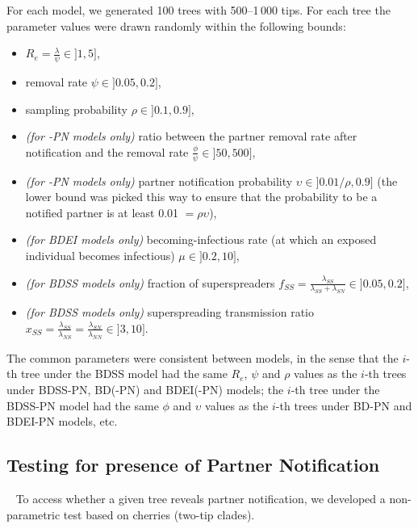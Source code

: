 \documentclass[10pt,letterpaper]{article}
\begin{document}
For each model, we generated 100 trees with 500--1\,000 tips. For each tree the parameter values were drawn randomly within the following bounds:
\begin{itemize}
\item $R_e = \frac{{\lambda}}{{\psi}} \in ]1, 5]$, 
\item removal rate $\psi \in ]0.05, 0.2]$,
\item sampling probability $\rho \in ]0.1, 0.9]$,
\item \textit{(for -PN models only)} ratio between the partner removal rate after notification and the removal rate $\frac{\phi}{\psi} \in ]50, 500]$,
\item \textit{(for -PN models only)} partner notification probability $\upsilon \in ]0.01/\rho, 0.9]$ (the lower bound was picked this way to ensure that the probability to be a notified partner is at least 0.01 $=\rho \upsilon$),
\item \textit{(for BDEI models only)} becoming-infectious rate (at which an exposed individual becomes infectious) $\mu \in ]0.2, 10]$,
\item \textit{(for BDSS models only)} fraction of superspreaders $f_{SS} = \frac{\lambda_{SS}}{\lambda_{SS} + \lambda_{SN}} \in ]0.05, 0.2]$,
\item \textit{(for BDSS models only)} superspreading transmission ratio $x_{SS} = \frac{\lambda_{SS}}{\lambda_{NS}} = \frac{\lambda_{SN}}{\lambda_{NN}} \in ]3, 10]$.
\end{itemize} 

The common parameters were consistent between models, in the sense that the $i$-th tree under the BDSS model had the same $R_e$, $\psi$ and $\rho$ values as the $i$-th trees under BDSS-PN, BD(-PN) and BDEI(-PN) models; the $i$-th tree under the BDSS-PN model had the same $\phi$ and $\upsilon$ values as the $i$-th trees under BD-PN and BDEI-PN models, etc.



\subsection*{Testing for presence of Partner Notification}~\label{sec:test}
To access whether a given tree reveals partner notification, we developed a non-parametric test based on cherries (two-tip clades). 
\end{document}
